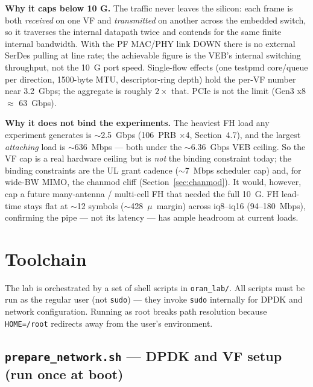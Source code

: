 \documentclass[11pt,a4paper]{article}
\newcommand{\us}{\ensuremath{\mu}\text{s}}
\begin{document}
\textbf{Why it caps below 10 G.} The traffic never leaves the silicon: each frame is both
\emph{received} on one VF and \emph{transmitted} on another across the embedded switch, so it
traverses the internal datapath twice and contends for the same finite internal bandwidth.
With the PF MAC/PHY link DOWN there is no external SerDes pulling at line rate; the achievable
figure is the VEB's internal switching throughput, not the 10~G port speed. Single-flow
effects (one testpmd core/queue per direction, 1500-byte MTU, descriptor-ring depth) hold the
per-VF number near 3.2~Gbps; the aggregate is roughly $2\times$ that. PCIe is not the limit
(Gen3 x8 $\approx$ 63~Gbps).

\textbf{Why it does not bind the experiments.} The heaviest FH load any experiment generates
is $\sim$2.5~Gbps (106~PRB $\times$4, Section~4.7), and the largest \emph{attaching} load is
$\sim$636~Mbps --- both under the $\sim$6.36~Gbps VEB ceiling. So the VF cap is a real
hardware ceiling but is \emph{not} the binding constraint today; the binding constraints are
the UL grant cadence ($\sim$7~Mbps scheduler cap) and, for wide-BW MIMO, the chanmod cliff
(Section~\ref{sec:chanmod}). It would, however, cap a future many-antenna / multi-cell FH that
needed the full 10~G. FH lead-time stays flat at $\sim$12 symbols ($\sim$428~\us\ margin)
across iq8--iq16 (94--180~Mbps), confirming the pipe --- not its latency --- has ample
headroom at current loads.

\section{Toolchain}

The lab is orchestrated by a set of shell scripts in \texttt{oran\_lab/}.
All scripts must be run as the regular user (not \texttt{sudo}) --- they invoke \texttt{sudo}
internally for DPDK and network configuration. Running as root breaks path resolution because
\texttt{HOME=/root} redirects away from the user's environment.

\subsection{\texttt{prepare\_network.sh} --- DPDK and VF setup (run once at boot)}
\end{document}
